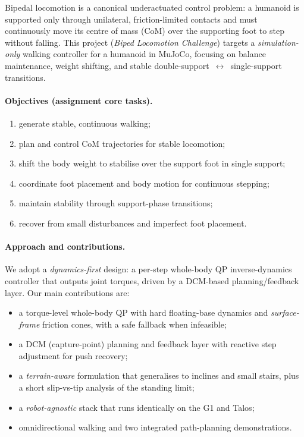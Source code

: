 \documentclass[11pt]{article}
\begin{document}
Bipedal locomotion is a canonical underactuated control problem: a humanoid is
supported only through unilateral, friction-limited contacts and must continuously
move its centre of mass (CoM) over the supporting foot to step without falling.
This project (\emph{Biped Locomotion Challenge}) targets a
\emph{simulation-only} walking controller for a humanoid in MuJoCo, focusing on
balance maintenance, weight shifting, and stable double-support~$\leftrightarrow$~single-support
transitions.

\paragraph{Objectives (assignment core tasks).}
\begin{enumerate}[label=(\alph*),itemsep=2pt]
    \item generate stable, continuous walking;
    \item plan and control CoM trajectories for stable locomotion;
    \item shift the body weight to stabilise over the support foot in single support;
    \item coordinate foot placement and body motion for continuous stepping;
    \item maintain stability through support-phase transitions;
    \item recover from small disturbances and imperfect foot placement.
\end{enumerate}

\paragraph{Approach and contributions.}
We adopt a \emph{dynamics-first} design: a per-step whole-body QP inverse-dynamics
controller that outputs joint torques, driven by a DCM-based planning/feedback
layer. Our main contributions are:
\begin{itemize}[itemsep=2pt]
    \item a torque-level whole-body QP with hard floating-base dynamics and
          \emph{surface-frame} friction cones, with a safe fallback when infeasible;
    \item a DCM (capture-point) planning and feedback layer with reactive step
          adjustment for push recovery;
    \item a \emph{terrain-aware} formulation that generalises to inclines and small
          stairs, plus a short slip-vs-tip analysis of the standing limit;
    \item a \emph{robot-agnostic} stack that runs identically on the G1 and Talos;
    \item omnidirectional walking and two integrated path-planning demonstrations.
\end{itemize}
\end{document}
